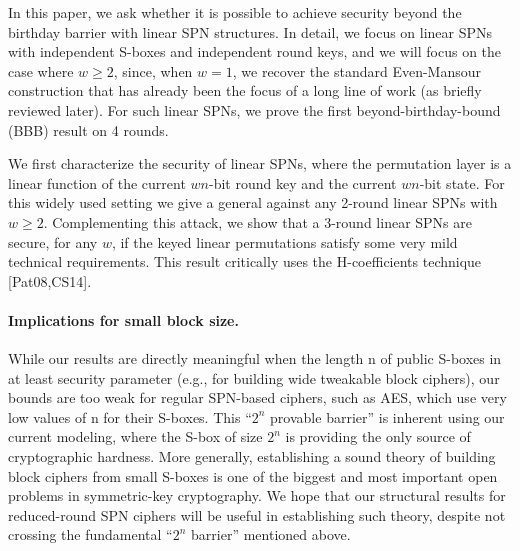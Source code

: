In this paper, we ask whether it is possible to achieve security beyond the birthday barrier with linear SPN structures. In detail, we focus on linear SPNs with independent S-boxes and independent round keys, and we will focus on the case where $w\geq2$, since, when $w = 1$, we recover the standard Even-Mansour construction that has already been the focus
of a long line of work (as briefly reviewed later). For such linear SPNs, we prove the first beyond-birthday-bound (BBB) result on 4 rounds.





We first characterize the security of linear SPNs, where the
permutation layer is a linear function of the current $wn$-bit round key and the current $wn$-bit state. For this widely used setting we give a
general against any 2-round linear SPNs with $w\geq2$. Complementing this
attack, we show that a 3-round linear SPNs are secure, for any $w$, if the keyed linear permutations satisfy some very mild technical requirements. This result critically uses the H-coefficients technique [Pat08,CS14].





\paragraph{Implications for small block size.}

While our results are directly meaningful
when the length n of public S-boxes in at least security parameter (e.g., for
building wide tweakable block ciphers), our bounds are too weak for regular SPN-based
ciphers, such as AES, which use very low values of n for their S-boxes.
This ``$2^n$ provable barrier'' is inherent using our current modeling, where the
S-box of size $2^n$ is providing the only source of cryptographic hardness. More
generally, establishing a sound theory of building block ciphers from small S-boxes is one of the biggest and most important open problems in symmetric-key
cryptography. We hope that our structural results for reduced-round SPN ciphers will be useful in establishing such theory, despite not crossing the fundamental ``$2^n$ barrier'' mentioned above.



%
%
%






